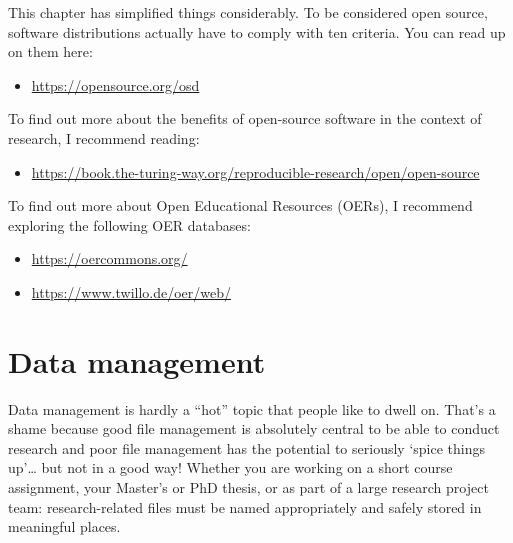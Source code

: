 \documentclass[
  letterpaper,
  DIV=11,
  numbers=noendperiod]{scrreprt}
\providecommand{\tightlist}{%
  \setlength{\itemsep}{0pt}\setlength{\parskip}{0pt}}\usepackage{longtable,booktabs,array}
\begin{document}
\begin{tcolorbox}[enhanced jigsaw, opacityback=0, bottomrule=.15mm, left=2mm, coltitle=black, bottomtitle=1mm, opacitybacktitle=0.6, leftrule=.75mm, arc=.35mm, breakable, toptitle=1mm, colframe=quarto-callout-note-color-frame, colback=white, titlerule=0mm, colbacktitle=quarto-callout-note-color!10!white, title=\textcolor{quarto-callout-note-color}{\faInfo}\hspace{0.5em}{Tips to go further}, rightrule=.15mm, toprule=.15mm]

This chapter has simplified things considerably. To be considered open
source, software distributions actually have to comply with ten
criteria. You can read up on them here:

\begin{itemize}
\tightlist
\item
  \url{https://opensource.org/osd}
\end{itemize}

To find out more about the benefits of open-source software in the
context of research, I recommend reading:

\begin{itemize}
\tightlist
\item
  \url{https://book.the-turing-way.org/reproducible-research/open/open-source}
\end{itemize}

To find out more about Open Educational Resources (OERs), I recommend
exploring the following OER databases:

\begin{itemize}
\tightlist
\item
  \url{https://oercommons.org/}
\item
  \url{https://www.twillo.de/oer/web/}
\end{itemize}

\end{tcolorbox}


\chapter{Data management}\label{data-management}

Data management is hardly a ``hot'' topic that people like to dwell on.
That's a shame because good file management is absolutely central to be
able to conduct research and poor file management has the potential to
seriously `spice things up'\ldots{} but not in a good way! Whether you
are working on a short course assignment, your Master's or PhD thesis,
or as part of a large research project team: research-related files must
be named appropriately and safely stored in meaningful places.
\end{document}
